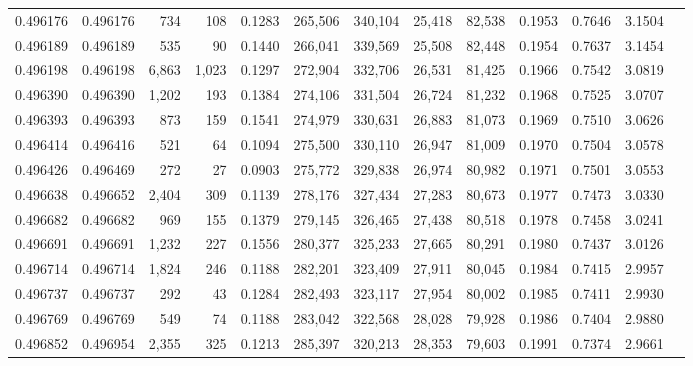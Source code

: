 \begin{tabular}{rrrrrrrrrrrrr}
0.496176 & 0.496176 &   734 &   108 &                                     0.1283 & 265,506 & 340,104 &  25,418 &  82,538 & 0.1953 & 0.7646 & 3.1504 \\
0.496189 & 0.496189 &   535 &    90 &                                     0.1440 & 266,041 & 339,569 &  25,508 &  82,448 & 0.1954 & 0.7637 & 3.1454 \\
0.496198 & 0.496198 & 6,863 & 1,023 &                                     0.1297 & 272,904 & 332,706 &  26,531 &  81,425 & 0.1966 & 0.7542 & 3.0819 \\
0.496390 & 0.496390 & 1,202 &   193 &                                     0.1384 & 274,106 & 331,504 &  26,724 &  81,232 & 0.1968 & 0.7525 & 3.0707 \\
0.496393 & 0.496393 &   873 &   159 &                                     0.1541 & 274,979 & 330,631 &  26,883 &  81,073 & 0.1969 & 0.7510 & 3.0626 \\
0.496414 & 0.496416 &   521 &    64 &                                     0.1094 & 275,500 & 330,110 &  26,947 &  81,009 & 0.1970 & 0.7504 & 3.0578 \\
0.496426 & 0.496469 &   272 &    27 &                                     0.0903 & 275,772 & 329,838 &  26,974 &  80,982 & 0.1971 & 0.7501 & 3.0553 \\
0.496638 & 0.496652 & 2,404 &   309 &                                     0.1139 & 278,176 & 327,434 &  27,283 &  80,673 & 0.1977 & 0.7473 & 3.0330 \\
0.496682 & 0.496682 &   969 &   155 &                                     0.1379 & 279,145 & 326,465 &  27,438 &  80,518 & 0.1978 & 0.7458 & 3.0241 \\
0.496691 & 0.496691 & 1,232 &   227 &                                     0.1556 & 280,377 & 325,233 &  27,665 &  80,291 & 0.1980 & 0.7437 & 3.0126 \\
0.496714 & 0.496714 & 1,824 &   246 &                                     0.1188 & 282,201 & 323,409 &  27,911 &  80,045 & 0.1984 & 0.7415 & 2.9957 \\
0.496737 & 0.496737 &   292 &    43 &                                     0.1284 & 282,493 & 323,117 &  27,954 &  80,002 & 0.1985 & 0.7411 & 2.9930 \\
0.496769 & 0.496769 &   549 &    74 &                                     0.1188 & 283,042 & 322,568 &  28,028 &  79,928 & 0.1986 & 0.7404 & 2.9880 \\
0.496852 & 0.496954 & 2,355 &   325 &                                     0.1213 & 285,397 & 320,213 &  28,353 &  79,603 & 0.1991 & 0.7374 & 2.9661 \\

\end{tabular}
